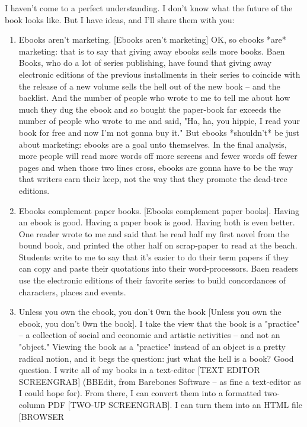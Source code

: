 I haven't come to a perfect understanding. I don't know what the
future of the book looks like. But I have ideas, and I'll share
them with you:

\begin{enumerate}
\item
  Ebooks aren't marketing. [Ebooks aren't marketing] OK, so ebooks
  *are* marketing: that is to say that giving away ebooks sells more
  books. Baen Books, who do a lot of series publishing, have found
  that giving away electronic editions of the previous installments
  in their series to coincide with the release of a new volume sells
  the hell out of the new book -- and the backlist. And the number of
  people who wrote to me to tell me about how much they dug the ebook
  and so bought the paper-book far exceeds the number of people who
  wrote to me and said, "Ha, ha, you hippie, I read your book for
  free and now I'm not gonna buy it." But ebooks *shouldn't* be just
  about marketing: ebooks are a goal unto themselves. In the final
  analysis, more people will read more words off more screens and
  fewer words off fewer pages and when those two lines cross, ebooks
  are gonna have to be the way that writers earn their keep, not the
  way that they promote the dead-tree editions.
\item
  Ebooks complement paper books. [Ebooks complement paper books].
  Having an ebook is good. Having a paper book is good. Having both
  is even better. One reader wrote to me and said that he read half
  my first novel from the bound book, and printed the other half on
  scrap-paper to read at the beach. Students write to me to say that
  it's easier to do their term papers if they can copy and paste
  their quotations into their word-processors. Baen readers use the
  electronic editions of their favorite series to build concordances
  of characters, places and events.
\item
  Unless you own the ebook, you don't 0wn the book [Unless you own
  the ebook, you don't 0wn the book]. I take the view that the book
  is a "practice" -- a collection of social and economic and artistic
  activities -- and not an "object." Viewing the book as a "practice"
  instead of an object is a pretty radical notion, and it begs the
  question: just what the hell is a book? Good question. I write all
  of my books in a text-editor [TEXT EDITOR SCREENGRAB] (BBEdit, from
  Barebones Software -- as fine a text-editor as I could hope for).
  From there, I can convert them into a formatted two-column PDF
  [TWO-UP SCREENGRAB]. I can turn them into an HTML file [BROWSER

\end{enumerate}

